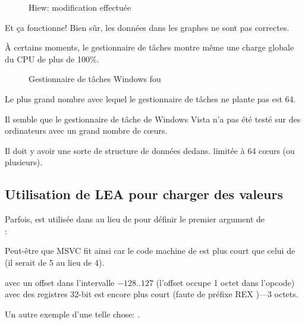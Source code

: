 \begin{figure}[H]
\centering
{}
\caption{Hiew: modification effectuée}
\end{figure}

Et ça fonctionne!
Bien sûr, les données dans les graphes ne sont pas correctes.

À certains moments, le gestionnaire de tâches montre même une charge globale du CPU
de plus de 100\%.

\begin{figure}[H]
\centering
{}
\caption{Gestionnaire de tâches Windows fou}
\end{figure}

Le plus grand nombre avec lequel le gestionnaire de tâches ne plante pas est 64.

Il semble que le gestionnaire de tâche de Windows Vista n'a pas été testé sur des
ordinateurs avec un grand nombre de c\oe{}urs.

Il doit y avoir une sorte de structure de données dedans. limitée à 64 c\oe{}urs
(ou plusieurs).

\subsection{Utilisation de LEA pour charger des valeurs}
\label{TaskMgr_LEA}

Parfois,  est utilisée dans  au lieu de  pour définir
le premier argument de \\
:




Peut-être que \ac{MSVC} fit ainsi car le code machine de  est plus court
que celui de  (il serait de 5 au lieu de 4).

 avec un offset dans l'intervalle $-128..127$ (l'offset occupe 1 octet dans
l'opcode) avec des registres 32-bit est encore plus court (faute de préfixe REX )---3
octets.

Un autre exemple d'une telle chose: .

